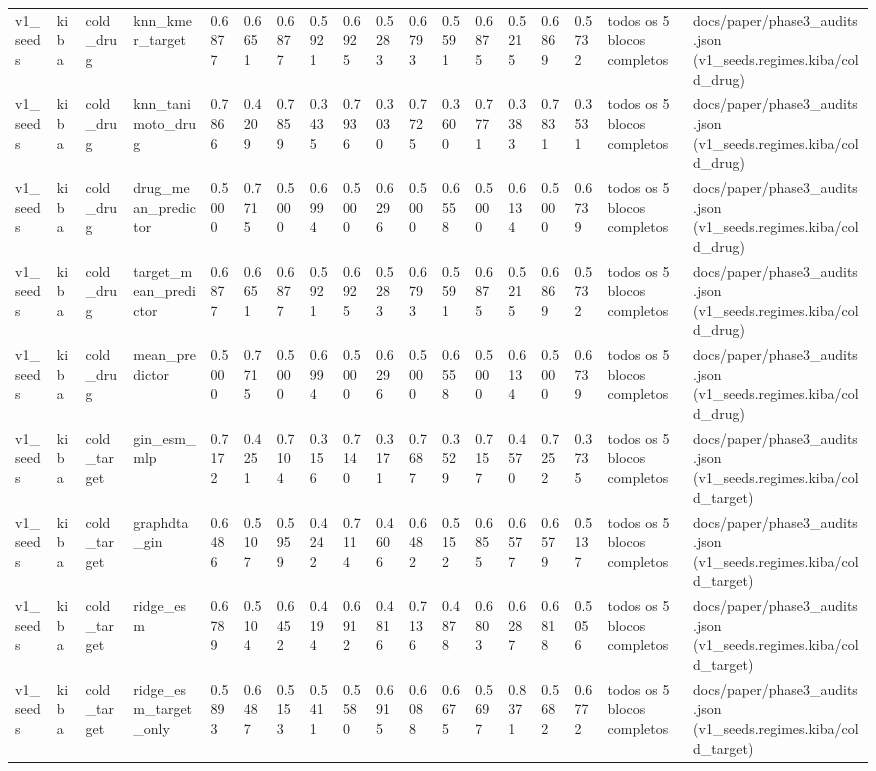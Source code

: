 \begin{table}[htbp]
\begin{tabular}{llllllllllllllllll}
v1\_seeds & kiba & cold\_drug & knn\_kmer\_target & 0.6877 & 0.6651 & 0.6877 & 0.5921 & 0.6925 & 0.5283 & 0.6793 & 0.5591 & 0.6875 & 0.5215 & 0.6869 & 0.5732 & todos os 5 blocos completos & docs/paper/phase3\_audits.json (v1\_seeds.regimes.kiba/cold\_drug) \\
v1\_seeds & kiba & cold\_drug & knn\_tanimoto\_drug & 0.7866 & 0.4209 & 0.7859 & 0.3435 & 0.7936 & 0.3030 & 0.7725 & 0.3600 & 0.7771 & 0.3383 & 0.7831 & 0.3531 & todos os 5 blocos completos & docs/paper/phase3\_audits.json (v1\_seeds.regimes.kiba/cold\_drug) \\
v1\_seeds & kiba & cold\_drug & drug\_mean\_predictor & 0.5000 & 0.7715 & 0.5000 & 0.6994 & 0.5000 & 0.6296 & 0.5000 & 0.6558 & 0.5000 & 0.6134 & 0.5000 & 0.6739 & todos os 5 blocos completos & docs/paper/phase3\_audits.json (v1\_seeds.regimes.kiba/cold\_drug) \\
v1\_seeds & kiba & cold\_drug & target\_mean\_predictor & 0.6877 & 0.6651 & 0.6877 & 0.5921 & 0.6925 & 0.5283 & 0.6793 & 0.5591 & 0.6875 & 0.5215 & 0.6869 & 0.5732 & todos os 5 blocos completos & docs/paper/phase3\_audits.json (v1\_seeds.regimes.kiba/cold\_drug) \\
v1\_seeds & kiba & cold\_drug & mean\_predictor & 0.5000 & 0.7715 & 0.5000 & 0.6994 & 0.5000 & 0.6296 & 0.5000 & 0.6558 & 0.5000 & 0.6134 & 0.5000 & 0.6739 & todos os 5 blocos completos & docs/paper/phase3\_audits.json (v1\_seeds.regimes.kiba/cold\_drug) \\
v1\_seeds & kiba & cold\_target & gin\_esm\_mlp & 0.7172 & 0.4251 & 0.7104 & 0.3156 & 0.7140 & 0.3171 & 0.7687 & 0.3529 & 0.7157 & 0.4570 & 0.7252 & 0.3735 & todos os 5 blocos completos & docs/paper/phase3\_audits.json (v1\_seeds.regimes.kiba/cold\_target) \\
v1\_seeds & kiba & cold\_target & graphdta\_gin & 0.6486 & 0.5107 & 0.5959 & 0.4242 & 0.7114 & 0.4606 & 0.6482 & 0.5152 & 0.6855 & 0.6577 & 0.6579 & 0.5137 & todos os 5 blocos completos & docs/paper/phase3\_audits.json (v1\_seeds.regimes.kiba/cold\_target) \\
v1\_seeds & kiba & cold\_target & ridge\_esm & 0.6789 & 0.5104 & 0.6452 & 0.4194 & 0.6912 & 0.4816 & 0.7136 & 0.4878 & 0.6803 & 0.6287 & 0.6818 & 0.5056 & todos os 5 blocos completos & docs/paper/phase3\_audits.json (v1\_seeds.regimes.kiba/cold\_target) \\
v1\_seeds & kiba & cold\_target & ridge\_esm\_target\_only & 0.5893 & 0.6487 & 0.5153 & 0.5411 & 0.5580 & 0.6915 & 0.6088 & 0.6675 & 0.5697 & 0.8371 & 0.5682 & 0.6772 & todos os 5 blocos completos & docs/paper/phase3\_audits.json (v1\_seeds.regimes.kiba/cold\_target) \\

\end{tabular}
\end{table}
